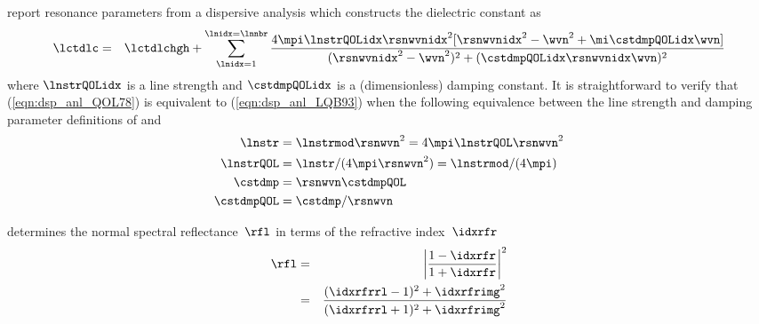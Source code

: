 \documentclass[12pt,twoside]{book}
\begin{document}
\cite{QOL78} report resonance parameters from a dispersive analysis 
which constructs the dielectric constant as
\begin{eqnarray}
\lctdlc & = & \lctdlchgh + \sum_{\lnidx=1}^{\lnidx=\lnnbr} 
\frac{4\mpi\lnstrQOLidx\rsnwvnidx^{2}[\rsnwvnidx^{2}-\wvn^{2}+\mi\cstdmpQOLidx\wvn]}
{(\rsnwvnidx^{2} - \wvn^{2})^{2} + (\cstdmpQOLidx\rsnwvnidx\wvn)^{2}}
\label{eqn:dsp_anl_QOL78}
\end{eqnarray}
where $\lnstrQOLidx$ is a line strength and $\cstdmpQOLidx$ is a
(dimensionless) damping constant.
It is straightforward to verify that (\ref{eqn:dsp_anl_QOL78}) is
equivalent to (\ref{eqn:dsp_anl_LQB93}) when the following equivalence
between the line strength and damping parameter definitions of
\cite{QOL78} and \cite{LQB93}
\begin{subequations}
\begin{align}
\lnstr &= \lnstrmod \rsnwvn^{2} = 4\mpi\lnstrQOL\rsnwvn^{2} \\
\lnstrQOL &= \lnstr/(4\mpi\rsnwvn^{2}) = \lnstrmod/(4\mpi) \\
\cstdmp &= \rsnwvn\cstdmpQOL \\
\cstdmpQOL &=  \cstdmp/\rsnwvn
\label{eqn:QOL78_LQB93}
\end{align}
\end{subequations}

 determines the normal spectral
reflectance~$\rfl$ in terms of the refractive index~$\idxrfr$ 
\begin{eqnarray}
\rfl & = & \left| \frac{1-\idxrfr}{1+\idxrfr} \right|^{2} \\
& = & \frac{(\idxrfrrl-1)^{2} + \idxrfrimg^{2}}{(\idxrfrrl+1)^{2} + \idxrfrimg^{2}}
\label{eqn:rfl_lrn_dfn}
\end{eqnarray}
\end{document}

